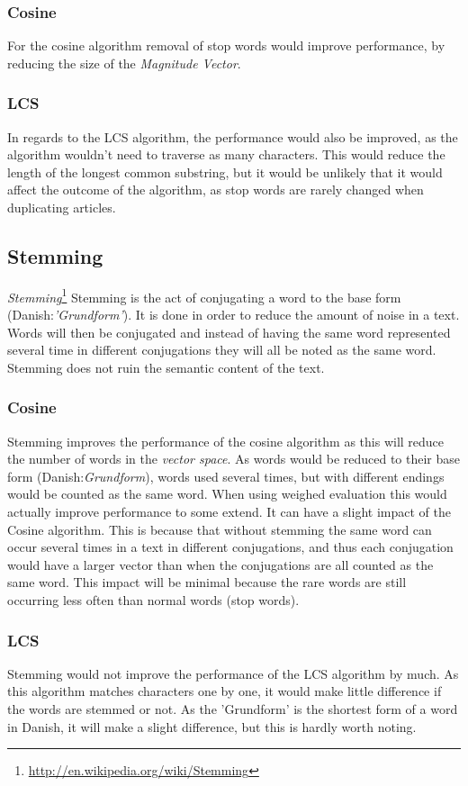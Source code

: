 \subsubsection{Cosine}
For the cosine algorithm removal of stop words would improve performance, by reducing the size of the \textit{Magnitude Vector}. 

\subsubsection{LCS}
In regards to the LCS algorithm, the performance would also be improved, as the algorithm wouldn't need to traverse as many characters. This would reduce the length of the longest common substring, but it would be unlikely that it would affect the outcome of the algorithm, as stop words are rarely changed when duplicating articles.

\subsection{Stemming}
\textit{Stemming}\footnote{\url{http://en.wikipedia.org/wiki/Stemming}} Stemming is the act of conjugating a word to the base form (Danish:\textit{'Grundform'}). It is done in order to reduce the amount of noise in a text. Words will then be conjugated and instead of having the same word represented several time in different conjugations they will all be noted as the same word. Stemming does not ruin the semantic content of the text.

\subsubsection{Cosine}
Stemming improves the performance of the cosine algorithm as this will reduce the number of words in the \textit{vector space}. As words would be reduced to their base form (Danish:\textit{Grundform}), words used several times, but with different endings would be counted as the same word. When using weighed evaluation this would actually improve performance to some extend. It can have a slight impact of the Cosine algorithm. This is because that without stemming the same word can occur several times in a text in different conjugations, and thus each conjugation would have a larger vector than when the conjugations are all counted as the same word. This impact will be minimal because the rare words are still occurring less often than normal words (stop words).

\subsubsection{LCS}
Stemming would not improve the performance of the LCS algorithm by much. As this algorithm matches characters one by one, it would make little difference if the words are stemmed or not. As the 'Grundform' is the shortest form of a word in Danish, it will make a slight difference, but this is hardly worth noting.

